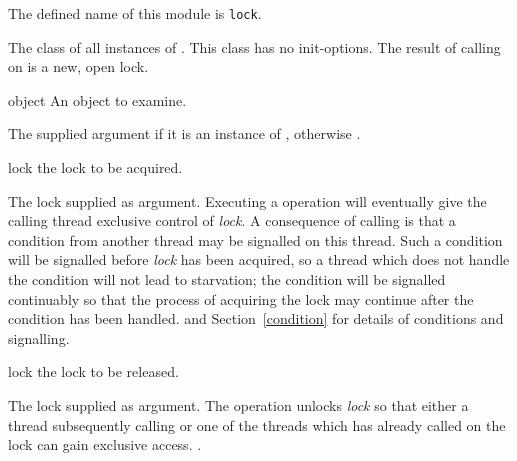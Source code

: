 \begin{optDefinition}
\label{lock}
\gdef\module{lock}
The defined name of this module is {\tt lock}.

%
The class of all instances of .  This class has no
init-options.  The result of calling  on 
is a new, open lock.

%
\begin{arguments}
    \item[object] An object to examine.
\end{arguments}
%
\result%
The supplied argument if it is an instance of ,
otherwise \nil.

%
\begin{arguments}
    \item[lock] the lock to be acquired.
\end{arguments}
%
\result%
The lock supplied as argument.
%
\remarks%
Executing a  operation will eventually give the calling thread
exclusive control of {\em lock}.  A consequence of calling  is
that a condition from another thread may be signalled on this thread.  Such a
condition will be signalled before {\em lock} has been acquired, so a thread
which does not handle the condition will not lead to starvation; the condition
will be signalled continuably so that the process of acquiring the lock may
continue after the condition has been handled.
%
\seealso%
 and Section~\ref{condition} for details of conditions and
signalling.

%
\begin{arguments}
    \item[lock] the lock to be released.
\end{arguments}
%
\result%
The lock supplied as argument.
%
\remarks%
The  operation unlocks {\em lock} so that either a thread
subsequently calling  or one of the threads which has already
called  on the lock can gain exclusive access.
%
\seealso%
.
%
\end{optDefinition}
